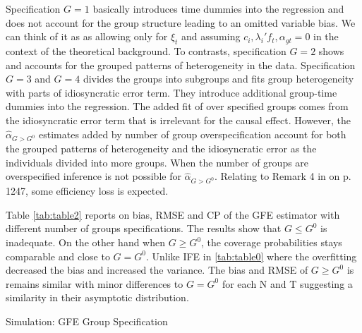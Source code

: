 Specification $G=1$ basically introduces time dummies into the regression and does not account for the group structure leading to an omitted variable bias. We can think of it as as allowing only for $\xi_t$ and assuming $c_i, \lambda_i' f_t, \alpha_{gt} = 0$ in the context of the theoretical background. 
To contrasts, specification $G=2$ shows and accounts for the grouped patterns of heterogeneity in the data. Specification $G=3$ and $G=4$ divides the groups into subgroups and fits group heterogeneity with parts of idiosyncratic error term. They introduce additional group-time dummies into the regression. The added fit of over specified groups comes from the idiosyncratic error term that is irrelevant for the causal effect. However, the $\hat{\alpha}_{G>G^0}$ estimates added by number of group overspecification account for both the grouped patterns of heterogeneity and the idiosyncratic error as the individuals divided into more groups. When the number of groups are overspecified inference is not possible for $\hat{\alpha}_{G>G^0}$. Relating to Remark 4 in \textcite{bai2009panel} on p. 1247, some efficiency loss is expected.

Table \ref{tab:table2} reports on bias, RMSE and CP of the GFE estimator with different number of groups specifications. The results show that $G \leq G^0$ is inadequate. On the other hand when $G \ge G^0$, the coverage probabilities stays comparable and close to $G = G^0$. Unlike IFE in \ref{tab:table0} where the overfitting decreased the bias and increased the variance. The bias and RMSE of $G \ge G^0$ is remains similar with minor differences to $G = G^0$ for each N and T suggesting a similarity in their asymptotic distribution. 

\begin{table}[p]
    \centering
    
    \caption{Simulation: GFE Group Specification} %
    \label{tab:table2}
\end{table}

